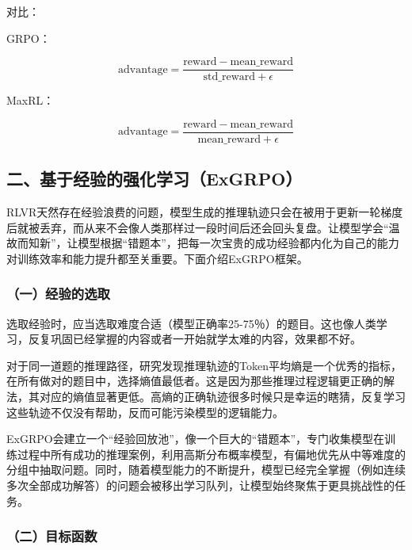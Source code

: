 对比：

GRPO：

\[
\mathrm{advantage}=\frac{\mathrm{reward}-\mathrm{mean\_reward}}{\mathrm{std\_reward}+\epsilon}
\]

MaxRL：

\[
\mathrm{advantage}=\frac{\mathrm{reward}-\mathrm{mean\_reward}}{\mathrm{mean\_reward}+\epsilon}
\]

\hypertarget{ux4e8cux57faux4e8eux7ecfux9a8cux7684ux5f3aux5316ux5b66ux4e60exgrpo}{%
\subsection{二、基于经验的强化学习（ExGRPO）}\label{ux4e8cux57faux4e8eux7ecfux9a8cux7684ux5f3aux5316ux5b66ux4e60exgrpo}}

RLVR天然存在经验浪费的问题，模型生成的推理轨迹只会在被用于更新一轮梯度后就被丢弃，而从来不会像人类那样过一段时间后还会回头复盘。让模型学会``温故而知新''，让模型根据``错题本''，把每一次宝贵的成功经验都内化为自己的能力对训练效率和能力提升都至关重要。下面介绍ExGRPO框架。

\hypertarget{ux4e00ux7ecfux9a8cux7684ux9009ux53d6}{%
\subsubsection{（一）经验的选取}\label{ux4e00ux7ecfux9a8cux7684ux9009ux53d6}}

选取经验时，应当选取难度合适（模型正确率25-75％）的题目。这也像人类学习，反复巩固已经掌握的内容或者一开始就学太难的内容，效果都不好。

对于同一道题的推理路径，研究发现推理轨迹的Token平均熵是一个优秀的指标，在所有做对的题目中，选择熵值最低者。这是因为那些推理过程逻辑更正确的解法，其对应的熵值显著更低。高熵的正确轨迹很多时候只是幸运的瞎猜，反复学习这些轨迹不仅没有帮助，反而可能污染模型的逻辑能力。

ExGRPO会建立一个``经验回放池''，像一个巨大的``错题本''，专门收集模型在训练过程中所有成功的推理案例，利用高斯分布概率模型，有偏地优先从中等难度的分组中抽取问题。同时，随着模型能力的不断提升，模型已经完全掌握（例如连续多次全部成功解答）的问题会被移出学习队列，让模型始终聚焦于更具挑战性的任务。

\hypertarget{ux4e8cux76eeux6807ux51fdux6570-2}{%
\subsubsection{（二）目标函数}\label{ux4e8cux76eeux6807ux51fdux6570-2}}


